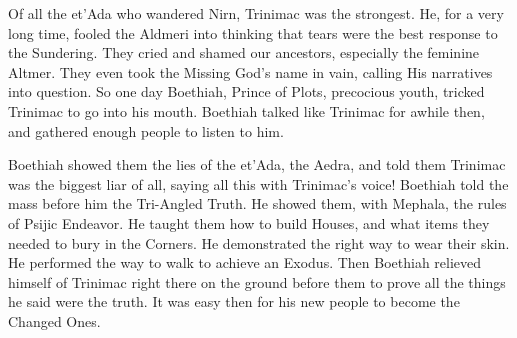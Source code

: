 
\dropcap Of all the et'Ada who wandered Nirn, Trinimac was the strongest. He, for a very long time, fooled the Aldmeri into thinking that tears were the best response to the Sundering. They cried and shamed our ancestors, especially the feminine Altmer. They even took the Missing God's name in vain, calling His narratives into question. So one day Boethiah, Prince of Plots, precocious youth, tricked Trinimac to go into his mouth. Boethiah talked like Trinimac for awhile then, and gathered enough people to listen to him. 

Boethiah showed them the lies of the et'Ada, the Aedra, and told them Trinimac was the biggest liar of all, saying all this with Trinimac's voice! Boethiah told the mass before him the Tri-Angled Truth. He showed them, with Mephala, the rules of Psijic Endeavor. He taught them how to build Houses, and what items they needed to bury in the Corners. He demonstrated the right way to wear their skin. He performed the way to walk to achieve an Exodus. Then Boethiah relieved himself of Trinimac right there on the ground before them to prove all the things he said were the truth. It was easy then for his new people to become the Changed Ones.